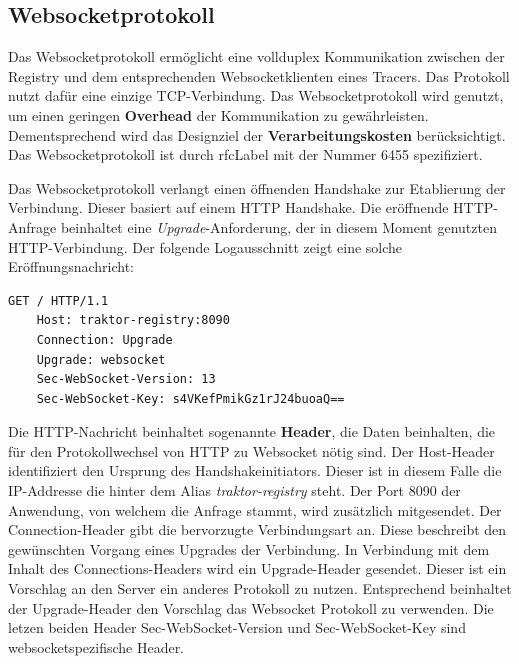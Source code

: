 \subsection{Websocketprotokoll}
\label{subsection:Websocketprotokoll}

Das Websocketprotokoll ermöglicht eine vollduplex Kommunikation zwischen der Registry und dem entsprechenden Websocketklienten eines Tracers. Das Protokoll nutzt dafür eine einzige TCP-Verbindung. Das Websocketprotokoll wird genutzt, um einen geringen \textbf{Overhead} der Kommunikation zu gewährleisten. Dementsprechend wird das Designziel der \textbf{Verarbeitungskosten} berücksichtigt. Das Websocketprotokoll ist durch \gls{rfcLabel} mit der Nummer 6455 spezifiziert.

Das Websocketprotokoll verlangt einen öffnenden Handshake zur Etablierung der Verbindung. Dieser basiert auf einem HTTP Handshake. Die eröffnende HTTP-Anfrage beinhaltet eine \emph{Upgrade}-Anforderung, der in diesem Moment genutzten HTTP-Verbindung. Der folgende Logausschnitt zeigt eine solche Eröffnungsnachricht:

\begin{minipage}[]{\textwidth}
	\begin{lstlisting}[frame=trBL]
	GET / HTTP/1.1
	Host: traktor-registry:8090
	Connection: Upgrade
	Upgrade: websocket
	Sec-WebSocket-Version: 13
	Sec-WebSocket-Key: s4VKefPmikGz1rJ24buoaQ==
	\end{lstlisting}
	\label{listing:Eröffnender Websocket Handshake}
\end{minipage} 

Die HTTP-Nachricht beinhaltet sogenannte \textbf{Header}, die Daten beinhalten, die für den Protokollwechsel von HTTP zu Websocket nötig sind. Der Host-Header identifiziert den Ursprung des Handshakeinitiators. Dieser ist in diesem Falle die IP-Addresse die hinter dem Alias \emph{traktor-registry} steht. Der Port 8090 der Anwendung, von welchem die Anfrage stammt, wird zusätzlich mitgesendet. Der Connection-Header gibt die bervorzugte Verbindungsart an. Diese beschreibt den gewünschten Vorgang eines Upgrades der Verbindung. In Verbindung mit dem Inhalt des Connections-Headers wird ein Upgrade-Header gesendet. Dieser ist ein Vorschlag an den Server ein anderes Protokoll zu nutzen. Entsprechend beinhaltet der Upgrade-Header den Vorschlag das Websocket Protokoll zu verwenden. Die letzen beiden Header Sec-WebSocket-Version und Sec-WebSocket-Key sind websocketspezifische Header.

